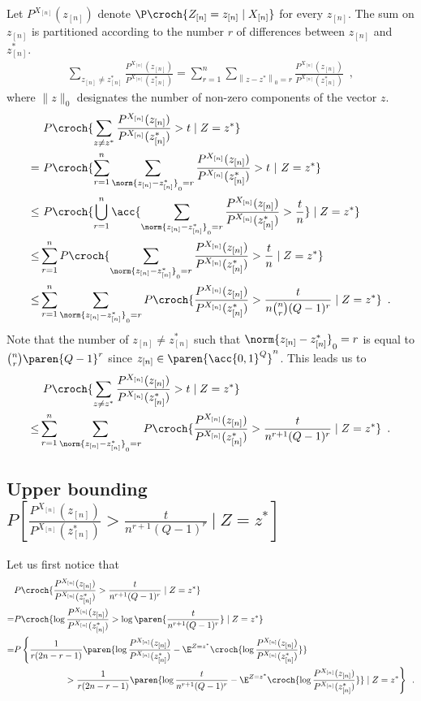 \documentclass[11pt]{article}
\newcommand{\Xn}{X_{[n]}}
\newcommand{\Zn}{Z_{[n]}}
\newcommand{\zn}{z_{[n]}}
\newcommand{\PXn}{P^{\Xn}}
\begin{document}
Let $\PXn(\zn)$ denote $\P\croch{\Zn=\zn\mid \Xn}$ for every $\zn$.
%
The sum on $\zn$ is partitioned according to the number $r$ of differences between $\zn$ and $\zn^*$.
\begin{align*}\sum_{\zn \neq \zn^*}
\frac{\PXn(\zn)}{\PXn(\zn^*)} =\sum_{r=1}^n \sum_{\left\| z-z^* \right\|_0
=r} \frac{\PXn(\zn)}{\PXn(\zn^*)}\enspace ,
\end{align*}
where $\|z \|_0$ designates the number of
non-zero components of the vector $z$.
\begin{align*}
&\ P \croch{ \sum_{z \neq z^*} \frac{\PXn(\zn)}{\PXn(\zn^*)} > t \mid Z=z^*} \nonumber \\
 = &\  P \croch{ \sum_{r=1}^n \sum_{\norm{\zn-\zn^*}_0=r}
\frac{\PXn(\zn)}{\PXn(\zn^*)} > t \ | \ Z=z^*} \nonumber \\
 \leq &\  P \croch{ \bigcup_{r=1}^n \acc{\sum_{\norm{\zn-\zn^*}_0=r}
\frac{\PXn(\zn)}{\PXn(\zn^*)} > \frac{t}{n}} \mid Z=z^* } \nonumber \\
 \leq & \sum_{r=1}^n P \croch{ \sum_{\norm{\zn-\zn^*}_0=r}
\frac{\PXn(\zn)}{\PXn(\zn^*)} > \frac{t}{n}\mid Z=z^*} \nonumber \\
 \leq & \sum_{r=1}^n \sum_{\norm{\zn-\zn^*}_0=r} P \croch{
\frac{\PXn(\zn)}{\PXn(\zn^*)} > \frac{t}{n {n\choose r}(Q-1)^{r}} \mid Z=z^*}
 \enspace .
\end{align*}
%
Note that the number of $\zn\neq\zn^*$ such that
$\norm{\zn-\zn^*}_0=r$ is equal to ${n\choose r} \paren{Q-1}^r$ since $\zn\in
\paren{\acc{0,1}^Q}^n$.
%
This leads us to
\begin{align*}
        &\ P \croch{ \sum_{z \neq z^*} \frac{\PXn(\zn)}{\PXn(\zn^*)} > t \mid Z=z^*}\\
 \leq & \sum_{r=1}^n \sum_{\norm{\zn-\zn^*}_0=r} P \croch{
\frac{\PXn(\zn)}{\PXn(\zn^*)} > \frac{t}{n^{r+1}(Q-1)^{r}} \mid Z=z^*}
 \enspace .
\end{align*}

\subsection{Upper bounding $P \left[ \frac{\PXn(\zn)}{\PXn(\zn^*)} >
\frac{t}{n^{r+1}(Q-1)^{r}} \ | \ Z=z^* \right]$}

Let us first notice that
\begin{align*}
 & P \croch{ \frac{\PXn(\zn)}{\PXn(\zn^*)} >
\frac{t}{n^{r+1}(Q-1)^{r}} \mid Z=z^*} \\
= & P \croch{ \log \frac{\PXn(\zn)}{\PXn(\zn^*)} > \log \paren{\frac{t}{n^{r+1}(Q-1)^{r}}} \mid Z=z^* } \\
= & P \left\{ \frac{1}{r(2n-r-1)} \paren{ \log \frac{\PXn(\zn)}{\PXn(\zn^*)} - \E^{Z=z^*}
\croch{ \log \frac{\PXn(\zn)}{\PXn(\zn^*)} } }  \right.\\
& \left. \hspace*{2cm} > \frac{1}{r(2n-r-1)} \paren{ \log
\frac{t}{n^{r+1}(Q-1)^{r}} -\E^{Z=z^*}
\croch{ \log \frac{\PXn(\zn)}{\PXn(\zn^*)} }} \mid Z=z^* \right\}  \enspace.\\
\end{align*}
\end{document}
